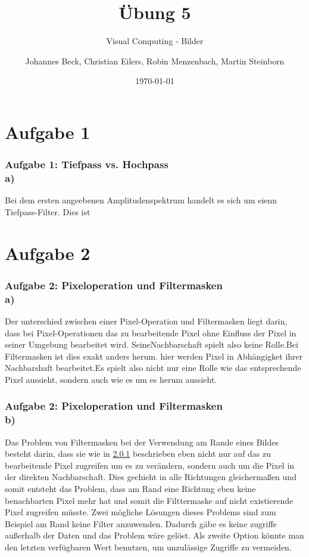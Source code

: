 \documentclass[accentcolor=tud1a,colorbacktitle,inverttitle,landscape,german,presentation,t]{tudbeamer}
\begin{document}
\title{\"Ubung 5}
\subtitle{Visual Computing - Bilder}

\author[Johannes Beck, Christian Eilers, Robin Menzenbach, Martin Steinborn]{Johannes Beck, Christian Eilers, Robin Menzenbach, Martin Steinborn}


\date{\today}

\begin{titleframe}
\end{titleframe}

\section{Aufgabe 1}
	\begin{frame}
		\frametitle{Aufgabe 1: Tiefpass vs. Hochpass \\ a)}
		Bei dem ersten angeebenen Amplitudenspektrum handelt es sich um eienn Tiefpass-Filter. Dies ist 
	\end{frame}
\section{Aufgabe 2}
	\begin{frame}
		\frametitle{Aufgabe 2: Pixeloperation und Filtermasken \\ a)}
			\label{2_a}
			Der unterschied zwischen einer Pixel-Operation und Filtermasken liegt darin, dass bei Pixel-Operationen das zu bearbeitende Pixel ohne Einfluss der Pixel in seiner Umgebung bearbeitet wird. SeineNachbarschaft spielt also keine Rolle.Bei Filtermasken ist dies exakt anders herum. hier werden Pixel in Abhängigket ihrer Nachbarshaft bearbeitet.Es spielt also nicht nur eine Rolle wie das entsprechende Pixel aussieht, sondern auch wie es um es herum aussieht.
	\end{frame}

	\begin{frame}
		\frametitle{Aufgabe 2: Pixeloperation und Filtermasken \\ b)}
		Das Problem von Filtermasken bei der Verwendung am Rande eines Bildes besteht darin, dass sie wie in \ref{2_a} beschrieben eben nicht nur auf das zu bearbeitende Pixel zugreifen um es  zu verändern, sondern auch um die Pixel in der direkten Nachbarschaft. Dies gechieht in alle Richtungen gleichermaßen und somit entsteht das Problem, dass am Rand eine Richtung eben keine benachbarten Pixel mehr hat und somit die Filttermaske auf nicht existierende Pixel zugreifen müsste. Zwei mögliche Lösungen dieses Problems sind zum Beispiel am Rand keine Filter anzuwenden. Dadurch gäbe es keine zugriffe außerhalb der Daten und das Problem wäre gelöst. Als zweite Option könnte man den letzten verfügbaren Wert benutzen, um unzulässige Zugriffe zu vermeiden. 
	\end{frame}
	
\end{document}
